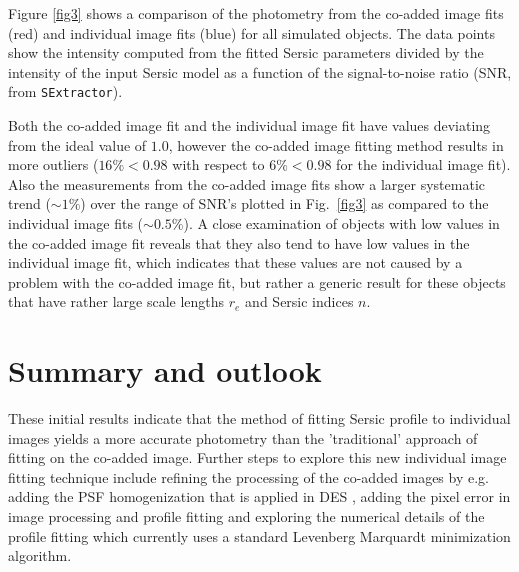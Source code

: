 \documentclass[11pt,twoside]{article}
\begin{document}
Figure \ref{fig3} shows a comparison of the photometry from the co-added image fits (red)
and individual image fits (blue) for all simulated objects. The data points show the
intensity computed from the fitted Sersic parameters divided by the intensity of the
input Sersic model as a function of the signal-to-noise ratio (SNR, from {\tt SExtractor}).

Both the co-added image fit and the individual image fit have values deviating from
the ideal value of $1.0$, however the co-added image fitting method results in more
outliers ($16\%< 0.98$ with respect to $6\% < 0.98$ for the individual image fit).
Also the measurements from the co-added image fits show a larger
systematic trend ($\sim1\%$) over the range of SNR's plotted in Fig.\ \ref{fig3} as compared
to the individual image fits ($\sim0.5\%$). A close examination
of objects with low values in the co-added image fit reveals that they also
tend to have low values in the individual image fit, which indicates that
these values are not caused by a problem with the co-added image fit, but rather
a generic result for these objects that have rather large scale lengths $r_e$
and Sersic indices $n$.

\section{Summary and outlook}
These initial results indicate that the method of fitting Sersic profile to
individual images yields a more accurate photometry 
than the 'traditional' approach of
fitting on the co-added image. Further steps to explore this new individual image
fitting technique include refining the processing of the co-added images by e.g.
adding the PSF homogenization that is applied in DES \citep{2008SPIE.7016E..17M},
adding the pixel error in image processing and profile fitting and exploring the
numerical details of the profile fitting which currently uses a standard
Levenberg Marquardt minimization algorithm.
%

\end{document}
